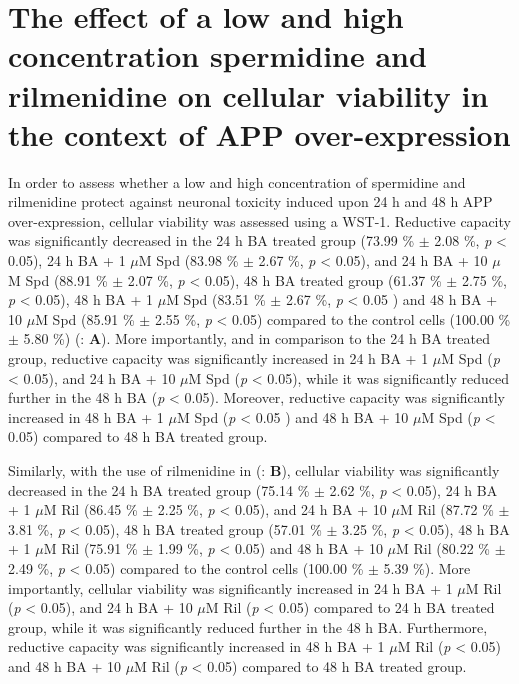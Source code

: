 \section{The effect of a low and high concentration spermidine and rilmenidine on cellular viability in the context of APP over-expression}
In order to assess whether a low and high concentration of spermidine and rilmenidine protect against neuronal toxicity induced upon  24 h and 48 h APP over-expression, cellular viability was assessed using a WST-1. Reductive capacity was significantly decreased in the 24 h BA treated group (73.99 \% $\pm$ 2.08 \%, \textit{p} < 0.05), 24 h BA + 1 $\mu$M Spd (83.98 \% $\pm$ 2.67 \%, \textit{p} < 0.05), and 24 h BA + 10 $\mu$M Spd (88.91 \% $\pm$ 2.07 \%, \textit{p} < 0.05), 48 h BA treated group (61.37 \% $\pm$ 2.75 \%, \textit{p} < 0.05), 48 h BA + 1 $\mu$M Spd (83.51 \% $\pm$ 2.67 \%, \textit{p} < 0.05 ) and 48 h BA + 10 $\mu$M Spd (85.91 \% $\pm$ 2.55 \%, \textit{p} < 0.05) compared to the control cells (100.00 \% $\pm$ 5.80 \%) (: \textbf{A}). More importantly, and in comparison to the 24 h BA treated group, reductive capacity was significantly increased in 24 h BA + 1 $\mu$M Spd (\textit{p} < 0.05), and 24 h BA + 10 $\mu$M Spd (\textit{p} < 0.05), while it was significantly reduced further in the 48 h BA (\textit{p} < 0.05). Moreover, reductive capacity was significantly increased in 48 h BA + 1 $\mu$M Spd (\textit{p} < 0.05 ) and 48 h BA + 10 $\mu$M Spd (\textit{p} < 0.05) compared to 48 h BA treated group. 

Similarly, with the use of rilmenidine in (: \textbf{B}), cellular viability was significantly decreased in the 24 h BA treated group (75.14 \% $\pm$ 2.62 \%, \textit{p} < 0.05), 24 h BA + 1 $\mu$M Ril (86.45 \% $\pm$ 2.25 \%, \textit{p} < 0.05), and 24 h BA + 10 $\mu$M Ril (87.72 \% $\pm$ 3.81 \%, \textit{p} < 0.05), 48 h BA treated group (57.01 \% $\pm$ 3.25 \%, \textit{p} < 0.05), 48 h BA + 1 $\mu$M Ril (75.91 \% $\pm$ 1.99 \%, \textit{p} < 0.05) and 48 h BA + 10 $\mu$M Ril (80.22 \% $\pm$ 2.49 \%, \textit{p} < 0.05) compared to the control cells (100.00 \% $\pm$ 5.39 \%). More importantly, cellular viability was significantly increased in 24 h BA + 1 $\mu$M Ril (\textit{p} < 0.05), and 24 h BA + 10 $\mu$M Ril (\textit{p} < 0.05) compared to 24 h BA treated group, while it was significantly reduced further in the 48 h BA. Furthermore, reductive capacity was significantly increased in 48 h BA + 1 $\mu$M Ril (\textit{p} < 0.05) and 48 h BA + 10 $\mu$M Ril (\textit{p} < 0.05) compared to 48 h BA treated group. 

